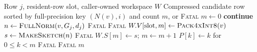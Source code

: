 \documentclass[a4paper,10pt]{article}
\theoremstyle{definition}
\theoremstyle{remark}
\begin{document}
\begin{algorithm}[H]
  \caption{Generating a candidate row and sorting it in full-precision order}
  \label{alg:prepare-row}
  \small
  \begin{algorithmic}[1]
    \Require Row $j$, resident-row slot, caller-owned workspace $W$
    \Ensure Compressed candidate row sorted by full-precision key $(N(v),i)$ and count $m$, or \textsc{Fatal}
      \State $m\gets0$
         \State \textbf{continue} \EndIf
        \State $n\gets\Call{FullNorm}{v,G_j,d_j}$
         \State \Return \textsc{Fatal} \EndIf
           \State \Return \textsc{Fatal} \EndIf
          \State $W.V[\mathrm{slot},m]\gets\Call{Pack4xInt8}{v}$
          \State $s\gets\Call{MakeSketch}{n}$
           \State \Return \textsc{Fatal} \EndIf
          \State $W.S[m]\gets s$; $m\gets m+1$
        \EndIf
      \EndFor
      \State $P[k]\gets k$ for $0\leq k<m$
      \State {}
       \State \Return \textsc{Fatal} \EndIf
        \State \Return \textsc{Fatal}
      \EndIf
      \State \Return $m$
    \EndFunction
  \end{algorithmic}
\end{algorithm}
\end{document}
